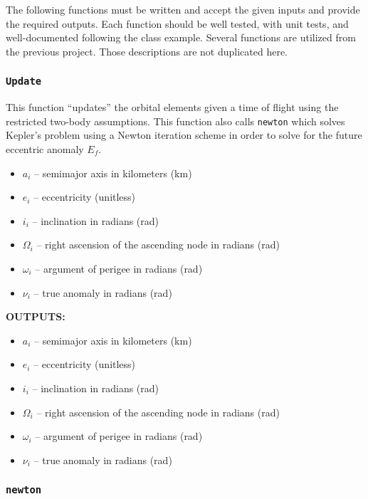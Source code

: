 \documentclass[11pt, reqno]{article}    %
\begin{document}
The following functions must be written and accept the given inputs and provide the required outputs. 
Each function should be well tested, with unit tests, and well-documented following the class example.
Several functions are utilized from the previous project. 
Those descriptions are not duplicated here.

\subsubsection*{\texttt{Update}}
This function ``updates'' the orbital elements given a time of flight using the restricted two-body assumptions.
This function also calls \texttt{newton} which solves Kepler's problem using a Newton iteration scheme in order to solve for the future eccentric anomaly \( E_f \).

\begin{itemize}
    \item \( a_i \)  -- semimajor axis in kilometers (\si{\kilo\meter})
    \item \( e_i \) -- eccentricity (unitless)
    \item \( i_i \) -- inclination in radians (\si{\radian})
    \item \( \Omega_i \) -- right ascension of the ascending node in radians (\si{\radian})
    \item \( \omega_i \) -- argument of perigee in radians (\si{\radian})
    \item \( \nu_i \) -- true anomaly in radians (\si{\radian})
\end{itemize}

\noindent \textbf{OUTPUTS:}
\begin{itemize}
    \item \( a_i \)  -- semimajor axis in kilometers (\si{\kilo\meter})
    \item \( e_i \) -- eccentricity (unitless)
    \item \( i_i \) -- inclination in radians (\si{\radian})
    \item \( \Omega_i \) -- right ascension of the ascending node in radians (\si{\radian})
    \item \( \omega_i \) -- argument of perigee in radians (\si{\radian})
    \item \( \nu_i \) -- true anomaly in radians (\si{\radian})
\end{itemize}

\subsubsection*{\texttt{newton}}
\end{document}
